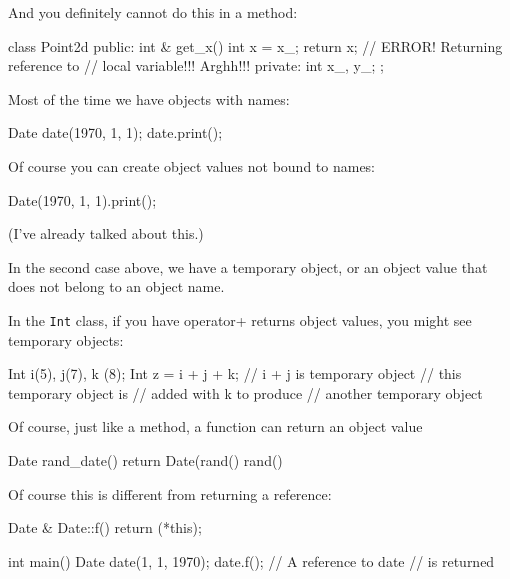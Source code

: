 And you definitely cannot do this in a method:

\begin{consolethree}[escapeinside=||]
class Point2d
{
public:
    int & get_x()
    {
        int x = x_;
        return x; // ERROR! Returning reference to
                  // local variable!!! Arghh!!!
    }
private:
    int x_, y_;
};
\end{consolethree}


\newpage{}

Most of the time we have objects with names:

\begin{consolethree}[escapeinside=||]
Date date(1970, 1, 1);
date.print();
\end{consolethree}

Of course you can create object values not bound to names:

\begin{consolethree}[escapeinside=||]
Date(1970, 1, 1).print();
\end{consolethree}

(I've already talked about this.)

In the second case above, we have a temporary object, or an object value
that does not belong to an object name.

In the \texttt{Int} class, if you have operator+ returns object values,
you might see temporary objects:

\begin{consolethree}[escapeinside=||]
Int i(5), j(7), k (8);
Int z = i + j + k; // i + j is temporary object
                   // this temporary object is
                   // added with k to produce
                   // another temporary object
\end{consolethree}

Of course, just like a method, a function can return an object value

\begin{consolethree}[escapeinside=||]
Date rand_date()
{
    return Date(rand()%
                rand()%
}
\end{consolethree}

Of course this is different from returning a reference:

\begin{consolethree}[escapeinside=||]
Date & Date::f()
{
    return (*this);
}

int main()
{
    Date date(1, 1, 1970);
    date.f(); // A reference to date
              // is returned
}
\end{consolethree}

